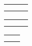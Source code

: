 \documentclass[letterpaper,10pt,english]{sphinxmanual}
\begin{document}
\begin{savenotes}\sphinxattablestart
\centering
\begin{tabulary}{\linewidth}[t]{|T|T|T|}
\hline
\sphinxstyletheadfamily 
{}
&\sphinxstyletheadfamily 
{}
&\sphinxstyletheadfamily 
{}
\\
\hline
{}
&
&
\\
\hline
{}
&
&
\\
\hline
\end{tabulary}
\par
\sphinxattableend\end{savenotes}


\begin{savenotes}\sphinxattablestart
\centering
\begin{tabulary}{\linewidth}[t]{|T|T|T|}
\hline
\sphinxstyletheadfamily 
{}
&\sphinxstyletheadfamily 
{}
&\sphinxstyletheadfamily 
{}
\\
\hline
{}
&
&
\\
\hline
{}
&
&
\\
\hline
\end{tabulary}
\par
\sphinxattableend\end{savenotes}


\begin{savenotes}\sphinxattablestart
\centering
\begin{tabulary}{\linewidth}[t]{|T|T|}
\hline
\sphinxstyletheadfamily 
\sphinxhyphen{}
&\sphinxstyletheadfamily 
{}
\\
\hline
{}
&
\\
\hline
{}
&
\\
\hline
\end{tabulary}
\par
\sphinxattableend\end{savenotes}
\end{document}
